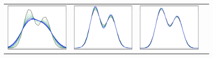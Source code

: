 \documentclass[11pt,preprint]{aastex}
\begin{document}
\begin{figure}
\begin{center}
\begin{tabular}{@{}c@{}c@{}c@{}c@{}}
\includegraphics[height=\figh]{plots3/boxes-09} &
\includegraphics[height=\figh]{plots3/boxes-10} &
\includegraphics[height=\figh]{plots3/boxes-11}

\end{tabular}
\end{center}
\end{figure}
\end{document}
